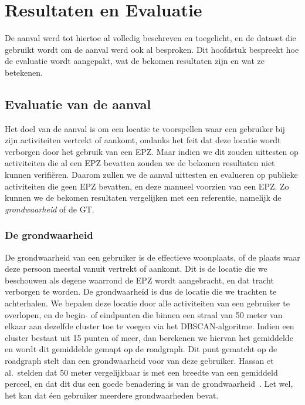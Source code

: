 \chapter{Resultaten en Evaluatie}
De aanval werd tot hiertoe al volledig beschreven en toegelicht, en de dataset
die gebruikt wordt om de aanval werd ook al besproken. Dit hoofdstuk bespreekt
hoe de evaluatie wordt aangepakt, wat de bekomen resultaten zijn en wat ze
betekenen.

\section{Evaluatie van de aanval}
Het doel van de aanval is om een locatie te voorspellen waar een gebruiker bij
zijn activiteiten vertrekt of aankomt, ondanks het feit dat deze locatie wordt
verborgen door het gebruik van een \ac{EPZ}. Maar indien we dit zouden
uittesten op activiteiten die al een \ac{EPZ} bevatten zouden we de bekomen
resultaten niet kunnen verifiëren. Daarom zullen we de aanval uittesten en
evalueren op publieke activiteiten die geen \ac{EPZ} bevatten, en deze manueel
voorzien van een \ac{EPZ}. Zo kunnen we de bekomen resultaten vergelijken met
een referentie, namelijk de \textit{grondwaarheid} of de \ac{GT}.

\subsection{De grondwaarheid}\label{sec:groundtruth}
De grondwaarheid van een gebruiker is de effectieve woonplaats, of de plaats
waar deze persoon meestal vanuit vertrekt of aankomt. Dit is de locatie die we
beschouwen als degene waarrond de \ac{EPZ} wordt aangebracht, en dat tracht
verborgen te worden. De grondwaarheid is dus de locatie die we trachten te
achterhalen. We bepalen deze locatie door alle activiteiten van een gebruiker
te overlopen, en de begin- of eindpunten die binnen een straal van 50 meter van
elkaar aan dezelfde cluster toe te voegen via het \ac{DBSCAN}-algoritme. Indien
een cluster bestaat uit 15 punten of meer, dan berekenen we hiervan het
gemiddelde en wordt dit gemiddelde gemapt op de roadgraph. Dit punt gematcht op
de roadgraph stelt dan een grondwaarheid voor van deze gebruiker. Hassan et
al.\ stelden dat 50 meter vergelijkbaar is met een breedte van een gemiddeld
perceel, en dat dit dus een goede benadering is van de
grondwaarheid~\cite{sec18has3:online, Verdonck_2022}. Let wel, het kan dat éen
gebruiker meerdere grondwaarheden bevat.

